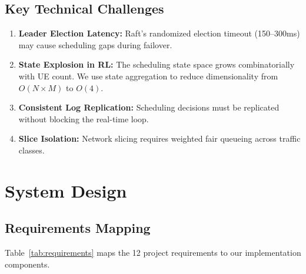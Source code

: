 \documentclass[journal]{IEEEtran}
\begin{document}
\subsection{Key Technical Challenges}

\begin{enumerate}
    \item \textbf{Leader Election Latency:} Raft's randomized election timeout (150--300ms) may cause scheduling gaps during failover.
    \item \textbf{State Explosion in RL:} The scheduling state space grows combinatorially with UE count. We use state aggregation to reduce dimensionality from $O(N \times M)$ to $O(4)$.
    \item \textbf{Consistent Log Replication:} Scheduling decisions must be replicated without blocking the real-time loop.
    \item \textbf{Slice Isolation:} Network slicing requires weighted fair queueing across traffic classes.
\end{enumerate}

\section{System Design}

\subsection{Requirements Mapping}

Table~\ref{tab:requirements} maps the 12 project requirements to our implementation components.
\end{document}
